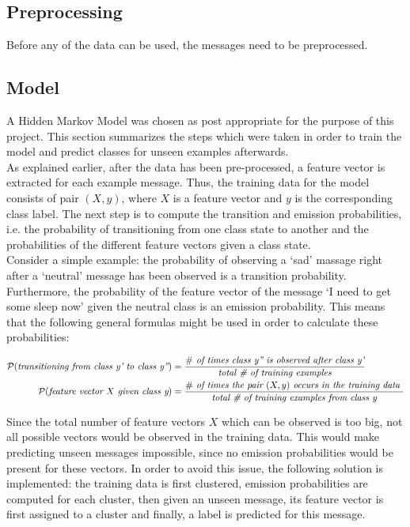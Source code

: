 \documentclass{article}
\begin{document}
\subsection*{Preprocessing}

Before any of the data can be used, the messages need to be preprocessed. 

\subsection*{Model}

A Hidden Markov Model was chosen as post appropriate for the purpose of this project. This section summarizes the steps which were taken in order to train the model and predict classes for unseen examples afterwards. \\

\noindent As explained earlier, after the data has been pre-processed, a feature vector is extracted for each example message. Thus, the training data for the model consists of pair $(X, y)$, where $X$ is a feature vector and $y$ is the corresponding class label. The next step is to compute the transition and emission probabilities, i.e. the probability of transitioning from one class state to another and the probabilities of the different feature vectors given a class state. \\

\noindent  Consider a simple example: the probability of observing a `sad' massage right after a `neutral' message has been observed is a transition probability. Furthermore, the probability of the feature vector of the message `I need to get some sleep now' given the neutral class is an emission probability. This means that the following general formulas might be used in order to calculate these probabilities:

\begin{align*}
\cal{P} (\textit{transitioning from class y' to class y''}) 
&= \frac {\# \textit{ of times class y'' is observed after class y'}} {\textit {total \# of training examples}} \\
\cal{P} (\textit{feature vector $X$ given class y}) 
&= \frac {\# \textit{ of times the pair $(X, y)$ occurs in the training data }} {\textit {total \# of training examples from class y}} \\
\end{align*}

\noindent Since the total number of feature vectors $X$ which can be observed is too big, not all possible vectors would be observed in the training data. This would make predicting unseen messages impossible, since no emission probabilities would be present for these vectors. In order to avoid this issue, the following solution is implemented: the training data is first clustered, emission probabilities are computed for each cluster, then given an unseen message, its feature vector is first assigned to a cluster and finally, a label is predicted for this message. \\
\end{document}
